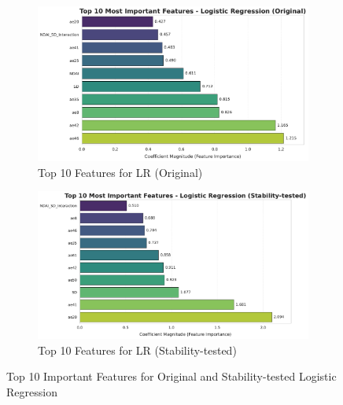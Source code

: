 \documentclass[11pt,letterpaper]{article}
\begin{document}
\begin{figure}[H]
  \centering
  \begin{subfigure}[b]{0.46\textwidth}
      \centering
      \includegraphics[width=\textwidth]{figs/sc3.pdf}
      \caption{Top 10 Features for LR (Original)}
      \label{fig:original_importance}
  \end{subfigure}
  \begin{subfigure}[b]{0.48\textwidth}
      \centering
      \includegraphics[width=\textwidth]{figs/sc4.pdf}
      \caption{Top 10 Features for LR (Stability-tested)}
      \label{fig:stabiltiy_importance}
  \end{subfigure}
  \caption{Top 10 Important Features for Original and Stability-tested Logistic Regression}
  \label{fig:comparing_importance}
\end{figure}\noindent


\end{document}
